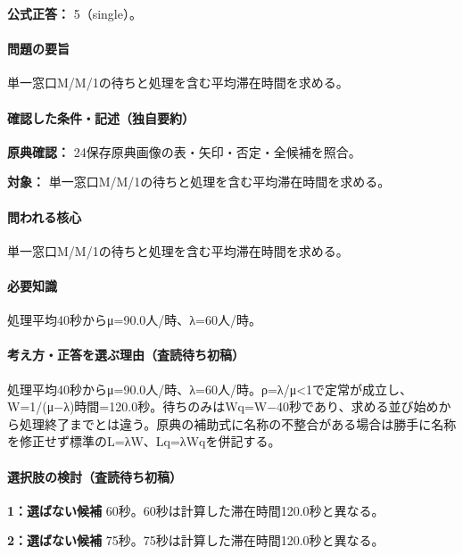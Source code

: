 \textbf{公式正答：} 5（single）。

\paragraph{問題の要旨} 単一窓口M/M/1の待ちと処理を含む平均滞在時間を求める。

\paragraph{確認した条件・記述（独自要約）}\mbox{}\par

\noindent\textbf{原典確認：} 24保存原典画像の表・矢印・否定・全候補を照合。\par

\noindent\textbf{対象：} 単一窓口M/M/1の待ちと処理を含む平均滞在時間を求める。\par

\paragraph{問われる核心} 単一窓口M/M/1の待ちと処理を含む平均滞在時間を求める。

\paragraph{必要知識} 処理平均40秒からμ=90.0人/時、λ=60人/時。

\paragraph{考え方・正答を選ぶ理由（査読待ち初稿）} 処理平均40秒からμ=90.0人/時、λ=60人/時。ρ=λ/μ<1で定常が成立し、W=\allowbreak{}1/(μ−λ)時間=120.0秒。待ちのみはWq=\allowbreak{}W−40秒であり、求める並び始めから処理終了までとは違う。原典の補助式に名称の不整合がある場合は勝手に名称を修正せず標準のL=λW、Lq=λWqを併記する。

\paragraph{選択肢の検討（査読待ち初稿）}\mbox{}\par

\noindent\textbf{1：選ばない候補} 60秒。60秒は計算した滞在時間120.0秒と異なる。\par

\noindent\textbf{2：選ばない候補} 75秒。75秒は計算した滞在時間120.0秒と異なる。\par

